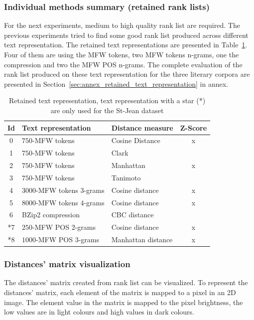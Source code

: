 \subsubsection{Individual methods summary (retained rank lists)}

For the next experiments, medium to high quality rank list are required.
The previous experiments tried to find some good rank list produced across different text representation.
The retained text representations are presented in Table~\ref{tab:9rl}.
Four of them are using the MFW tokens, two MFW tokens n-grams, one the compression and two the MFW POS n-grams.
The complete evaluation of the rank list produced on these text representation for the three literary corpora are presented in Section~\ref{sec:annex_retained_text_representation} in annex.

\begin{table}
  \centering
  \caption{Retained text representation, text representation with a star (*) are only used for the St-Jean dataset}
  \label{tab:9rl}
  \begin{tabular}{c l l c}
    \toprule
    Id &
    Text representation &
    Distance measure &
    Z-Score \\
    \midrule
    0 & $750$-MFW tokens & Cosine Distance & x\\
    1 & $750$-MFW tokens & Clark & \\
    2 & $750$-MFW tokens & Manhattan & x\\
    3 & $750$-MFW tokens & Tanimoto & \\
    4 & $3000$-MFW tokens $3$-grams & Cosine distance & x\\
    5 & $8000$-MFW tokens $4$-grams & Cosine distance & x\\
    6 & BZip2 compression & CBC distance & \\
    *7 & $250$-MFW POS $2$-grams & Cosine distance & x\\
    *8 & $1000$-MFW POS $3$-grams & Manhattan distance & x\\
    \bottomrule
  \end{tabular}
\end{table}

\subsubsection{Distances' matrix visualization}

The distances' matrix created from rank list can be visualized.
To represent the distances' matrix, each element of the matrix is mapped to a pixel in an 2D image.
The element value in the matrix is mapped to the pixel brightness, the low values are in light colours and high values in dark colours.

